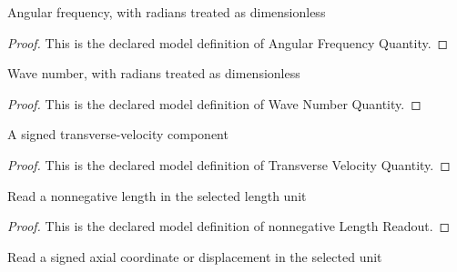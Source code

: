 \begin{definition}
  \label{def:physics:phyx-mini-0296:phyxminiproblems-problemphyxmini0296-angularfrequencyquantity}
  Angular frequency, with radians treated as dimensionless
\end{definition}
\begin{proof}
  This is the declared model definition of Angular Frequency Quantity.
\end{proof}
\begin{definition}
  \label{def:physics:phyx-mini-0296:phyxminiproblems-problemphyxmini0296-wavenumberquantity}
  Wave number, with radians treated as dimensionless
\end{definition}
\begin{proof}
  This is the declared model definition of Wave Number Quantity.
\end{proof}
\begin{definition}
  \label{def:physics:phyx-mini-0296:phyxminiproblems-problemphyxmini0296-transversevelocityquantity}
  A signed transverse-velocity component
\end{definition}
\begin{proof}
  This is the declared model definition of Transverse Velocity Quantity.
\end{proof}
\begin{definition}
  \label{def:physics:phyx-mini-0296:phyxminiproblems-problemphyxmini0296-nonnegativelengthreadout}
  Read a nonnegative length in the selected length unit
\end{definition}
\begin{proof}
  This is the declared model definition of nonnegative Length Readout.
\end{proof}
\begin{definition}
  \label{def:physics:phyx-mini-0296:phyxminiproblems-problemphyxmini0296-signedlengthreadout}
  Read a signed axial coordinate or displacement in the selected unit
\end{definition}
